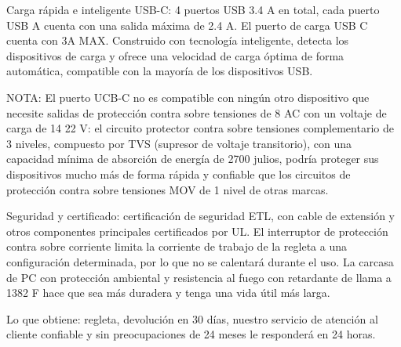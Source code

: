     Carga rápida e inteligente USB-C: 4 puertos USB 3.4 A en total, cada puerto USB A cuenta con una salida máxima de 2.4 A. El puerto de carga USB C cuenta con 3A MAX. Construido con tecnología inteligente, detecta los dispositivos de carga y ofrece una velocidad de carga óptima de forma automática, compatible con la mayoría de los dispositivos USB.
    
    NOTA: El puerto UCB-C no es compatible con ningún otro dispositivo que necesite
    salidas de protección contra sobre tensiones de 8 AC con un voltaje de carga de 14 22 V: el circuito protector contra sobre tensiones complementario de 3 niveles, compuesto por TVS (supresor de voltaje transitorio), con una capacidad mínima de absorción de energía de 2700 julios, podría proteger sus dispositivos mucho más de forma rápida y confiable que los circuitos de protección contra sobre tensiones MOV de 1 nivel de otras marcas.
    
    Seguridad y certificado: certificación de seguridad ETL, con cable de extensión y otros componentes principales certificados por UL. El interruptor de protección contra sobre corriente limita la corriente de trabajo de la regleta a una configuración determinada, por lo que no se calentará durante el uso. La carcasa de PC con protección ambiental y resistencia al fuego con retardante de llama a 1382 F hace que sea más duradera y tenga una vida útil más larga.
    
    Lo que obtiene: regleta, devolución en 30 días, nuestro servicio de atención al cliente confiable y sin preocupaciones de 24 meses le responderá en 24 horas.
    
